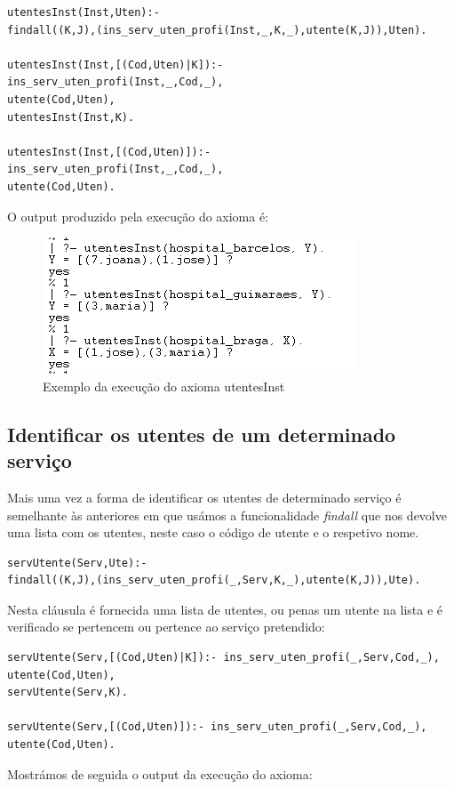 \begin{verbatim}
utentesInst(Inst,Uten):-
findall((K,J),(ins_serv_uten_profi(Inst,_,K,_),utente(K,J)),Uten).      

utentesInst(Inst,[(Cod,Uten)|K]):- 
ins_serv_uten_profi(Inst,_,Cod,_),
utente(Cod,Uten),
utentesInst(Inst,K).

utentesInst(Inst,[(Cod,Uten)]):-
ins_serv_uten_profi(Inst,_,Cod,_),
utente(Cod,Uten).
\end{verbatim}

O output produzido pela execução do axioma é:
\begin{figure}[<+htpb+>]
	\centering
	\includegraphics[scale=0.9]{answer2.png}
	\caption{Exemplo da execução do axioma utentesInst}
	\label{p3:fig:output2}
\end{figure}


\subsection{Identificar os utentes de um determinado serviço}
Mais uma vez a forma de identificar os utentes de determinado serviço é semelhante às anteriores em que usámos a funcionalidade \textit{findall} que nos devolve uma lista com os utentes, neste caso o código de utente e o respetivo nome. 

\begin{Verbatim}
servUtente(Serv,Ute):-
findall((K,J),(ins_serv_uten_profi(_,Serv,K,_),utente(K,J)),Ute).
\end{Verbatim}

Nesta cláusula é fornecida uma lista de utentes, ou penas um utente na lista e é verificado se pertencem ou pertence ao serviço pretendido: 
\begin{Verbatim}
servUtente(Serv,[(Cod,Uten)|K]):- ins_serv_uten_profi(_,Serv,Cod,_),
utente(Cod,Uten), 
servUtente(Serv,K).

servUtente(Serv,[(Cod,Uten)]):- ins_serv_uten_profi(_,Serv,Cod,_),
utente(Cod,Uten).
\end{Verbatim}


Mostrámos de seguida o output da execução do axioma: 

